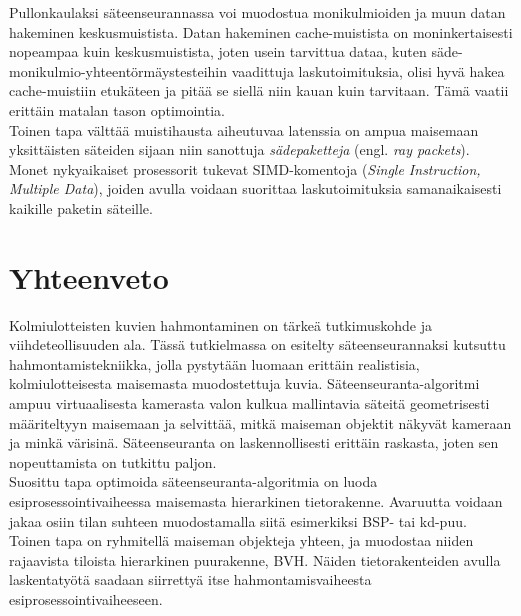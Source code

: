 \documentclass[a4paper, 12pt, titlepage]{article}
\begin{document}
Pullonkaulaksi säteenseurannassa voi muodostua monikulmioiden ja muun datan hakeminen keskusmuistista. Datan hakeminen cache-muistista on moninkertaisesti nopeampaa kuin keskusmuistista, joten usein tarvittua dataa, kuten säde-monikulmio-yhteentörmäystesteihin vaadittuja laskutoimituksia, olisi hyvä hakea cache-muistiin etukäteen ja pitää se siellä niin kauan kuin tarvitaan. Tämä vaatii erittäin matalan tason optimointia. \citep[.]{wald01}\\

Toinen tapa välttää muistihausta aiheutuvaa latenssia on ampua maisemaan yksittäisten säteiden sijaan niin sanottuja \emph{sädepaketteja} (engl. \emph{ray packets}). Monet nykyaikaiset prosessorit tukevat SIMD-komentoja (\emph{Single Instruction, Multiple Data}), joiden avulla voidaan suorittaa laskutoimituksia samanaikaisesti kaikille paketin säteille. \citep[.]{wald01}\\

 



\newpage
\section{Yhteenveto}

Kolmiulotteisten kuvien hahmontaminen on tärkeä tutkimuskohde ja viihdeteollisuuden ala. Tässä tutkielmassa on esitelty säteenseurannaksi kutsuttu hahmontamistekniikka, jolla pystytään luomaan erittäin realistisia, kolmiulotteisesta maisemasta muodostettuja kuvia. Säteenseuranta-algoritmi ampuu virtuaalisesta kamerasta valon kulkua mallintavia säteitä geometrisesti määriteltyyn maisemaan ja selvittää, mitkä maiseman objektit näkyvät kameraan ja minkä värisinä. Säteenseuranta on laskennollisesti erittäin raskasta, joten sen nopeuttamista on tutkittu paljon.    \\

Suosittu tapa optimoida säteenseuranta-algoritmia on luoda esiprosessointivaiheessa maisemasta hierarkinen tietorakenne. Avaruutta voidaan jakaa osiin tilan suhteen muodostamalla siitä esimerkiksi BSP- tai kd-puu. Toinen tapa on ryhmitellä maiseman objekteja yhteen, ja muodostaa niiden rajaavista tiloista hierarkinen puurakenne, BVH. Näiden tietorakenteiden avulla laskentatyötä saadaan siirrettyä itse hahmontamisvaiheesta esiprosessointivaiheeseen.\\
\end{document}
